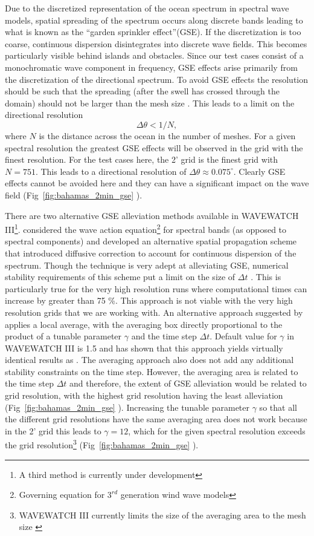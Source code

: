 \documentclass[12pt]{article}
\newcommand{\degree}{^{\circ}}
\begin{document}
Due to the discretized representation of the ocean spectrum in spectral wave models, spatial spreading of the spectrum occurs along discrete bands leading to what is known as the ``garden sprinkler effect''(GSE). If the discretization is too coarse, continuous dispersion disintegrates into discrete wave fields. This becomes particularly visible behind islands and obstacles. Since our test cases consist of a monochromatic wave component in frequency, GSE effects arise primarily from the discretization of the directional spectrum. To avoid GSE effects the resolution should be such that the spreading (after the swell has crossed through the domain) should not be larger than the mesh size \cite[]{boho-1987}. This leads to a limit on the directional resolution \[ \Delta \theta < 1/N, \]where $N$ is the distance across the ocean in the number of meshes. For a given spectral resolution the greatest GSE effects will be observed in the grid with the finest resolution. For the test cases here, the 2' grid is the finest grid with $N = 751$. This leads to a directional resolution of $\Delta \theta \approx 0.075 \degree$. Clearly GSE effects cannot be avoided here and they can have a significant impact on the wave field (Fig~\ref{fig:bahamas_2min_gse} ).  

There are two alternative GSE alleviation methods available in WAVEWATCH III\footnote{A third method is currently under development}. \cite{boho-1987} considered the wave action equation\footnote{Governing equation for $3^{rd}$ generation wind wave models} for spectral bands (as opposed to spectral components) and developed an alternative spatial propagation scheme that introduced diffusive correction to account for continuous dispersion of the spectrum. Though the technique is very adept at alleviating GSE, numerical stability requirements of this scheme put a limit on the size of $\Delta t$ \cite[]{tol2002}. This is particularly true for the very high resolution runs where computational times can increase by greater than 75 \%. This approach is not viable with the very high resolution grids that we are working with. An alternative approach suggested by \cite{tol2002} applies a local average, with the averaging box directly proportional to the product of a tunable parameter $\gamma$ and the time step $\Delta t$. Default value for $\gamma$ in WAVEWATCH III is 1.5 and \cite{tol2002} has shown that this approach yields virtually identical results as \cite{boho-1987}. The averaging approach also does not add any additional stability constraints on the time step. However, the averaging area is related to the time step $\Delta t$ and therefore, the extent of GSE alleviation would be related to grid resolution, with the highest grid resolution having the least alleviation (Fig~\ref{fig:bahamas_2min_gse} ). Increasing the tunable parameter $\gamma$ so that all the different grid resolutions have the same averaging area does not work because in the 2' grid this leads to $\gamma = 12$, which for the given spectral resolution exceeds the grid resolution\footnote{WAVEWATCH III currently limits the size of the averaging area to the mesh size \cite[]{tol2002}} (Fig~\ref{fig:bahamas_2min_gse} ). 
\end{document}
